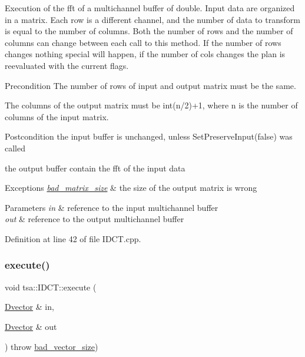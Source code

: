 Execution of the fft of a multichannel buffer of double. Input data are organized in a matrix. Each row is a different channel, and the number of data to transform is equal to the number of columns. Both the number of rows and the number of columns can change between each call to this method. If the number of rows changes nothing special will happen, if the number of cols changes the plan is reevaluated with the current flags.

\begin{DoxyPrecond}{Precondition}
The number of rows of input and output matrix must be the same. 

The columns of the output matrix must be int(n/2)+1, where n is the number of columns of the input matrix.
\end{DoxyPrecond}
\begin{DoxyPostcond}{Postcondition}
the input buffer is unchanged, unless Set\+Preserve\+Input(false) was called 

the output buffer contain the fft of the input data
\end{DoxyPostcond}

\begin{DoxyExceptions}{Exceptions}
{\em \hyperlink{classtsa_1_1bad__matrix__size}{bad\+\_\+matrix\+\_\+size}} & the size of the output matrix is wrong \\
\hline
\end{DoxyExceptions}

\begin{DoxyParams}{Parameters}
{\em in} & reference to the input multichannel buffer \\
\hline
{\em out} & reference to the output multichannel buffer \\
\hline
\end{DoxyParams}


Definition at line 42 of file I\+D\+C\+T.\+cpp.

\mbox{\label{classtsa_1_1_i_d_c_t_a8bb130d39013848471a191f45e93fb09}} 
\subsubsection{\texorpdfstring{execute()}{execute()}\hspace{0.1cm}{\footnotesize\ttfamily [2/2]}}
{\footnotesize\ttfamily void tsa\+::\+I\+D\+C\+T\+::execute (\begin{DoxyParamCaption}\item[{\hyperlink{namespacetsa_a8900fb03d849baf447a1a0efe2561fb2}{Dvector} \&}]{in,  }\item[{\hyperlink{namespacetsa_a8900fb03d849baf447a1a0efe2561fb2}{Dvector} \&}]{out }\end{DoxyParamCaption}) throw  \hyperlink{classtsa_1_1bad__vector__size}{bad\+\_\+vector\+\_\+size}) }

